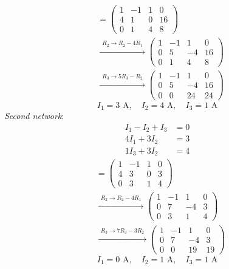 \begin{align*}
[A|b] &= \left(\begin{array}{ccc|c}1 & -1 & 1 & 0 \\ 4 & 1 & 0 & 16 \\ 0 & 1 & 4 & 8\end{array}\right) \\
&\xrightarrow{\substack{R_2\to R_2-4R_1}} \left(\begin{array}{ccc|c}1 & -1 & 1 & 0 \\ 0 & 5 & -4 & 16 \\ 0 & 1 & 4 & 8\end{array}\right) \\
&\xrightarrow{\substack{R_3\to 5R_3-R_2}} \left(\begin{array}{ccc|c}1 & -1 & 1 & 0 \\ 0 & 5 & -4 & 16 \\ 0 & 0 & 24 & 24\end{array}\right)
\end{align*}
\[ I_1=3\text{ A},\quad I_2=4\text{ A},\quad I_3=1\text{ A} \]
\noindent\emph{Second network}: \begin{align*}
I_1-I_2+I_3&=0 \\
4I_1+3I_2&=3 \\
1I_3+3I_2&=4
\end{align*}
\begin{align*}
[A|b] &= \left(\begin{array}{ccc|c}1 & -1 & 1 & 0 \\ 4 & 3 & 0 & 3 \\ 0 & 3 & 1 & 4\end{array}\right) \\
&\xrightarrow{\substack{R_2\to R_2-4R_1}} \left(\begin{array}{ccc|c}1 & -1 & 1 & 0 \\ 0 & 7 & -4 & 3 \\ 0 & 3 & 1 & 4\end{array}\right) \\
&\xrightarrow{\substack{R_3\to 7R_3-3R_2}} \left(\begin{array}{ccc|c}1 & -1 & 1 & 0 \\ 0 & 7 & -4 & 3 \\ 0 & 0 & 19 & 19\end{array}\right)
\end{align*}
\[ I_1=0\text{ A},\quad I_2=1\text{ A},\quad I_3=1\text{ A} \]
